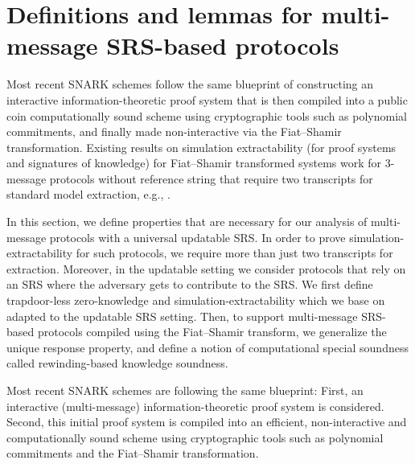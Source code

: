 \section{Definitions and lemmas for multi-message SRS-based protocols}
\label{sec:se_definitions}




Most recent SNARK schemes follow the same blueprint of constructing an interactive information-theoretic proof system 
that is then compiled into a public coin computationally sound scheme using cryptographic tools such as polynomial commitments,
and finally made non-interactive via the Fiat--Shamir transformation.
Existing results on simulation extractability (for proof systems and
signatures of knowledge) for Fiat--Shamir transformed systems work for $3$-message protocols without reference string that
require two transcripts for standard model extraction, e.g.,
\cite{JC:PoiSte00,INDOCRYPT:FKMV12,C:RotSeg21}.

In this section, we define properties that are necessary for our
analysis of multi-message protocols with a universal updatable SRS.  In order to
prove simulation-extractability for such protocols, we require more than just two
transcripts for extraction. Moreover, in the updatable setting we consider protocols
that rely on an SRS where the adversary gets to contribute to the SRS. 
We first define trapdoor-less zero-knowledge and simulation-extractability
which we base on~\cite{INDOCRYPT:FKMV12} adapted to the updatable SRS setting. Then,
to support multi-message SRS-based protocols compiled using the Fiat--Shamir transform,
we generalize the unique response property, and define a notion of computational special
soundness called rewinding-based knowledge soundness.

\iffalse 
Most recent SNARK schemes
are following the same blueprint: First, an interactive (multi-message)
information-theoretic proof system is considered.
Second, this initial proof system is compiled into an efficient, non-interactive and
computationally sound scheme using cryptographic tools such as polynomial commitments
and the Fiat--Shamir transformation.

